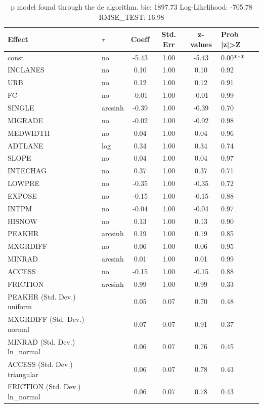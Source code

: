 \begin{table}
	\caption{p model found through the de algorithm. bic: 1897.73 Log-Likelihood: -705.78 RMSE_TEST: 16.98}
	\begin{center}
		\begin{tabular}{|l|l|c|c|c|l|}
			\hline
			Effect & $\tau$ & Coeff & Std. Err & z-values & Prob |z|>Z \\
			\hline
			const & no & -5.43 & 1.00 & -5.43 & 0.00*** \\
			\hline
			INCLANES & no & 0.10 & 1.00 & 0.10 & 0.92 \\
			\hline
			URB & no & 0.12 & 1.00 & 0.12 & 0.91 \\
			\hline
			FC & no & -0.01 & 1.00 & -0.01 & 0.99 \\
			\hline
			SINGLE & arcsinh & -0.39 & 1.00 & -0.39 & 0.70 \\
			\hline
			MIGRADE & no & -0.02 & 1.00 & -0.02 & 0.98 \\
			\hline
			MEDWIDTH & no & 0.04 & 1.00 & 0.04 & 0.96 \\
			\hline
			ADTLANE & log & 0.34 & 1.00 & 0.34 & 0.74 \\
			\hline
			SLOPE & no & 0.04 & 1.00 & 0.04 & 0.97 \\
			\hline
			INTECHAG & no & 0.37 & 1.00 & 0.37 & 0.71 \\
			\hline
			LOWPRE & no & -0.35 & 1.00 & -0.35 & 0.72 \\
			\hline
			EXPOSE & no & -0.15 & 1.00 & -0.15 & 0.88 \\
			\hline
			INTPM & no & -0.04 & 1.00 & -0.04 & 0.97 \\
			\hline
			HISNOW & no & 0.13 & 1.00 & 0.13 & 0.90 \\
			\hline
			PEAKHR & arcsinh & 0.19 & 1.00 & 0.19 & 0.85 \\
			\hline
			MXGRDIFF & no & 0.06 & 1.00 & 0.06 & 0.95 \\
			\hline
			MINRAD & arcsinh & 0.01 & 1.00 & 0.01 & 0.99 \\
			\hline
			ACCESS & no & -0.15 & 1.00 & -0.15 & 0.88 \\
			\hline
			FRICTION & arcsinh & 0.99 & 1.00 & 0.99 & 0.33 \\
			\hline
			PEAKHR (Std. Dev.) uniform &  & 0.05 & 0.07 & 0.70 & 0.48 \\
			\hline
			MXGRDIFF (Std. Dev.) normal &  & 0.07 & 0.07 & 0.91 & 0.37 \\
			\hline
			MINRAD (Std. Dev.) ln_normal &  & 0.06 & 0.07 & 0.76 & 0.45 \\
			\hline
			ACCESS (Std. Dev.) triangular &  & 0.06 & 0.07 & 0.78 & 0.43 \\
			\hline
			FRICTION (Std. Dev.) ln_normal &  & 0.06 & 0.07 & 0.78 & 0.43 \\
			\hline
		\end{tabular}
	\end{center}
\end{table}
